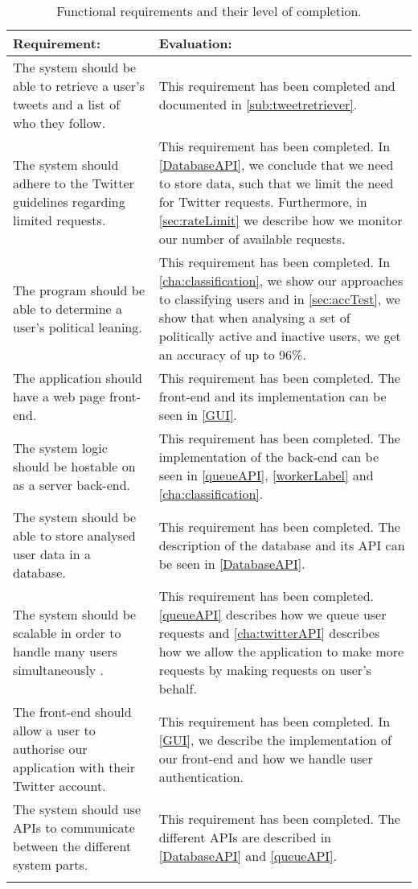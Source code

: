 \begin{longtable}{|p{6cm}|p{8cm}|}\hline 
\textbf{Requirement:}	&	\textbf{Evaluation:} \\\hline
The system should be able to retrieve a user's tweets and a list of who they
follow.
&	This requirement has been completed and documented in
\autoref{sub:tweetretriever}.\\\hline 
The system should adhere to the Twitter guidelines regarding limited requests.
&	This requirement has been completed. In \autoref{DatabaseAPI}, we
conclude that we need to store data, such that we limit the need for
Twitter requests. Furthermore, in \autoref{sec:rateLimit} we describe how we
monitor our number of available requests. \\\hline
The program should be able to determine a user's political leaning.
&	This requirement has been completed. In \autoref{cha:classification}, we
show our approaches to classifying users and in \autoref{sec:accTest}, we show
that when analysing a set of politically active and inactive users, we get an
accuracy of up to 96\%.\\\hline
The application should have a web page front-end.
&	This requirement has been completed. The front-end and its implementation can
be seen in \autoref{GUI}. \\\hline
The system logic should be hostable on as a server back-end.
& This requirement has been completed. The implementation of the back-end can be
seen in \autoref{queueAPI}, \autoref{workerLabel} and
\autoref{cha:classification}. \\\hline
The system should be able to store analysed user data in a database.
&	This requirement has been completed. The description of the database and its
API can be seen in \autoref{DatabaseAPI}. \\\hline
The system should be scalable in order to handle many users simultaneously .
&	This requirement has been completed. \autoref{queueAPI} describes how we queue
user requests and \autoref{cha:twitterAPI} describes how we allow the
application to make more requests by making requests on user's behalf.\\\hline
The front-end should allow a user to authorise our application with their
Twitter account.
&	This requirement has been completed. In \autoref{GUI}, we describe the
implementation of our front-end and how we handle user authentication. \\\hline
The system should use APIs to communicate between the different system parts.
&	This requirement has been completed. The different APIs are described in
\autoref{DatabaseAPI} and \autoref{queueAPI}.\\\hline
\caption{Functional requirements and their level of completion.}
\label{table:concFuncReq}
\end{longtable}


